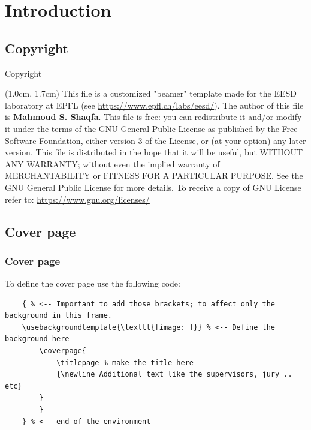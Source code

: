 \documentclass{EESD}
\begin{document}
\section{Introduction}


\subsection{Copyright}
\begin{frame}[t]{Copyright}
\begin{textblock*}{13cm}(1.0cm,  1.7cm)
    {\selectfont
    This file is a customized "beamer" template made for the EESD laboratory at EPFL (see \href{https://www.epfl.ch/labs/eesd/}{https://www.epfl.ch/labs/eesd/}). The author of this file is \textbf{Mahmoud S. Shaqfa}. This file is free: you can redistribute it and/or modify it under the terms of the GNU General Public License as published by    the Free Software Foundation, either version 3 of the License, or (at your option) any later version. This file is distributed in the hope that it will be useful, but WITHOUT ANY WARRANTY; without even the implied warranty of MERCHANTABILITY or FITNESS FOR A PARTICULAR PURPOSE.  See the GNU General Public License for more details. To receive a copy of GNU License refer to: \href{https://www.gnu.org/licenses/}{https://www.gnu.org/licenses/}
    }
\end{textblock*}
\end{frame}

\subsection{Cover page}
\begin{frame}[fragile]
\frametitle{Cover page}
    To define the cover page use the following code:
    \vspace{10pt}
    \begin{lstlisting}
    { % <-- Important to add those brackets; to affect only the background in this frame.
    \usebackgroundtemplate{\texttt{[image: ]}} % <-- Define the background here
        \coverpage{
            \titlepage % make the title here
            {\newline Additional text like the supervisors, jury .. etc}
        }
        }
    } % <-- end of the environment
    \end{lstlisting}
    \vspace{10pt}
\end{frame}
\end{document}
